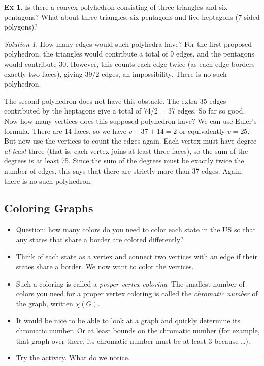 \documentclass[12pt]{article}
\theoremstyle{plain}
\theoremstyle{definition}
\newtheorem*{example}{Ex}
\theoremstyle{remark}
\newtheorem*{solution}{Solution}
\newcommand{\todayis}[1]{\clearpage{\rhead{\footnotesize #1}}}
\begin{document}
\begin{example}
  Is there a convex polyhedron consisting of three triangles and six pentagons?  What about three triangles, six pentagons and five heptagons (7-sided polygons)?

  \begin{solution}
  How many edges would such polyhedra have?  For the first proposed polyhedron, the triangles would contribute a total of 9 edges, and the pentagons would contribute 30.  However, this counts each edge twice (as each edge borders exactly two faces), giving 39/2 edges, an impossibility.  There is no such polyhedron.

  The second polyhedron does not have this obstacle. The extra 35 edges contributed by the heptagons give a total of 74/2 = 37 edges.  So far so good.  Now how many vertices does this supposed polyhedron have?  We can use Euler's formula.  There are 14 faces, so we have $v - 37 + 14 = 2$ or equivalently $v = 25$.  But now use the vertices to count the edges again.  Each vertex must have degree \emph{at least} three (that is, each vertex joins at least three faces), so the sum of the degrees is at least 75.  Since the sum of the degrees must be exactly twice the number of edges, this says that there are strictly more than 37 edges.  Again, there is no such polyhedron.
  \end{solution}
   \end{example}


   \todayis{Wednesday, September 19}

   \subsection*{Coloring Graphs}

   \begin{itemize}
   \item Question: how many colors do you need to color each state in the US so that any states that share a border are colored differently?

   \item Think of each state as a vertex and connect two vertices with an edge if their states share a border.  We now want to color the vertices.


   \item Such a coloring is called a {\em proper vertex coloring}.  The smallest number of colors you need for a proper vertex coloring is called the {\em chromatic number} of the graph, written $\chi(G)$.

   \item It would be nice to be able to look at a graph and quickly determine its chromatic number.  Or at least bounds on the chromatic number (for example, that graph over there, its chromatic number must be at least 3 because \ldots).

   \item Try the activity.  What do we notice.


   \end{itemize}
\end{document}
